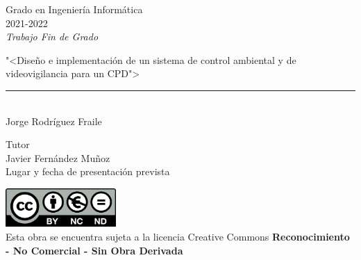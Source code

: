 \begin{titlepage}
	\begin{sffamily}
		\color{azulUC3M}
		\begin{center}
			\begin{figure}[H] %
				\label{fig:portadaLogo}
			\end{figure}
			\vspace{2.5cm}
			\begin{Large}
				Grado en Ingeniería Informática\\
				2021-2022\\
				\vspace{2cm}
				\textsl{Trabajo Fin de Grado}
				\bigskip
				
			\end{Large}
			{\Huge "<Diseño e implementación de un sistema de control ambiental y de videovigilancia para un CPD">}\\
			\vspace*{0.5cm}
			\rule{10.5cm}{0.1mm}\\
			\vspace*{0.9cm}
			{\LARGE Jorge Rodríguez Fraile}\\
			\vspace*{1cm}
			\begin{Large}
				Tutor\\
				Javier Fernández Muñoz\\
				Lugar y fecha de presentación prevista\\
			\end{Large}
		\end{center}
		\vfill
		\color{black}
		\includegraphics[width=4.2cm]{imagenes/creativecommons.png}\\ %
		Esta obra se encuentra sujeta a la licencia Creative Commons \textbf{Reconocimiento - No Comercial - Sin Obra Derivada}
	\end{sffamily}
\end{titlepage}